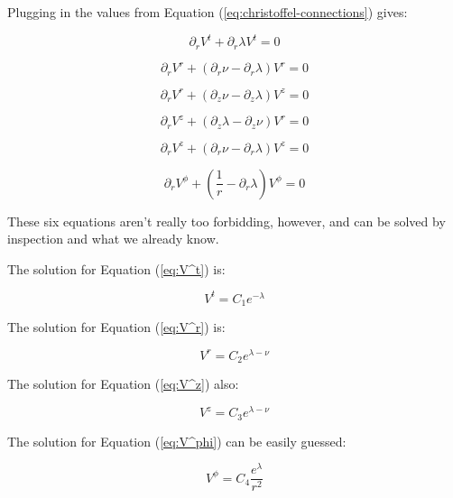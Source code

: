 \documentclass{article}
\begin{document}
Plugging in the values from Equation (\ref{eq:christoffel-connections}) gives:

\begin{equation}
\partial_{r}V^{t}+\partial_{r}\lambda V^{t}=0\label{eq:V^t}
\end{equation}

\begin{equation}
\partial_{r}V^{r}+\left(\partial_{r}\nu-\partial_{r}\lambda\right)V^{r}=0\label{eq:V^r}
\end{equation}

\begin{equation}
\partial_{r}V^{r}+\left(\partial_{z}\nu-\partial_{z}\lambda\right)V^{z}=0\label{eq:V^z}
\end{equation}

\begin{equation}
\partial_{r}V^{z}+\left(\partial_{z}\lambda-\partial_{z}\nu\right)V^{r}=0
\end{equation}

\begin{equation}
\partial_{r}V^{z}+\left(\partial_{r}\nu-\partial_{r}\lambda\right)V^{z}=0
\end{equation}

\begin{equation}
\partial_{r}V^{\phi}+\left(\frac{1}{r}-\partial_{r}\lambda\right)V^{\phi}=0\label{eq:V^phi}
\end{equation}

These six equations aren't really too forbidding, however, and can be solved by inspection and what we already know.

The solution for Equation (\ref{eq:V^t}) is:

\begin{equation}
V^{t}=C_{1}e^{-\lambda}
\end{equation}

The solution for Equation (\ref{eq:V^r}) is:

\begin{equation}
V^{r}=C_{2}e^{\lambda-\nu}
\end{equation}


The solution for Equation (\ref{eq:V^z}) also:

\begin{equation}
V^{z}=C_{3}e^{\lambda-\nu}
\end{equation}

The solution for Equation (\ref{eq:V^phi}) can be easily guessed:

\begin{equation}
V^{\phi}=C_{4}\frac{e^{\lambda}}{r^{2}}
\end{equation}
\end{document}
